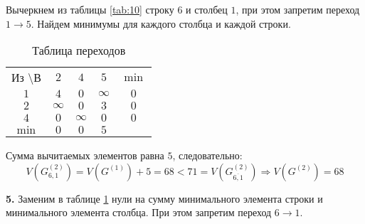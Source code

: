 Вычеркнем из таблицы \ref{tab:10} строку $6$ и столбец $1$, при этом запретим переход $1 \rightarrow 5$. Найдем минимумы для каждого столбца и каждой строки.

%

\begin{table}[H]
\begin{center}
	\def\tabcolsep{15pt}
	\caption{Таблица переходов}
	\label{tab:13}
	\begin{tabular}{|c||c|c|c|c|}
		\hline
		Из \textbackslash В & $2$ & $4$ & $5$ & $\min$ \\
		\hhline{|=#=|=|=|=|}
		$1$ & $4$ & $0$ & $\infty$ & $0$ \\
		\hline
		$2$ & $\infty$ & $0$ & $3$ & $0$ \\
		\hline
		$4$ & $0$ & $\infty$ & $0$ & $0$ \\
		\hhline{|=#=|=|=|=|}
		$\min$ & $0$ & $0$ & $5$ & \\ 
		\hline
	\end{tabular}
\end{center}
\end{table}

Сумма вычитаемых элементов равна $5$, следовательно:
\begin{equation*}
V(G_{6,1}^{(2)}) = V(G^{(1)}) + 5 = 68 < 71 = V(G_{\overline{6,1}}^{(2)})\Rightarrow V(G^{(2)}) = 68
\end{equation*}

\textbf{5.} Заменим в таблице \ref{tab:13} нули на сумму минимального элемента строки и минимального элемента столбца. При этом запретим переход $6 \rightarrow 1$.

